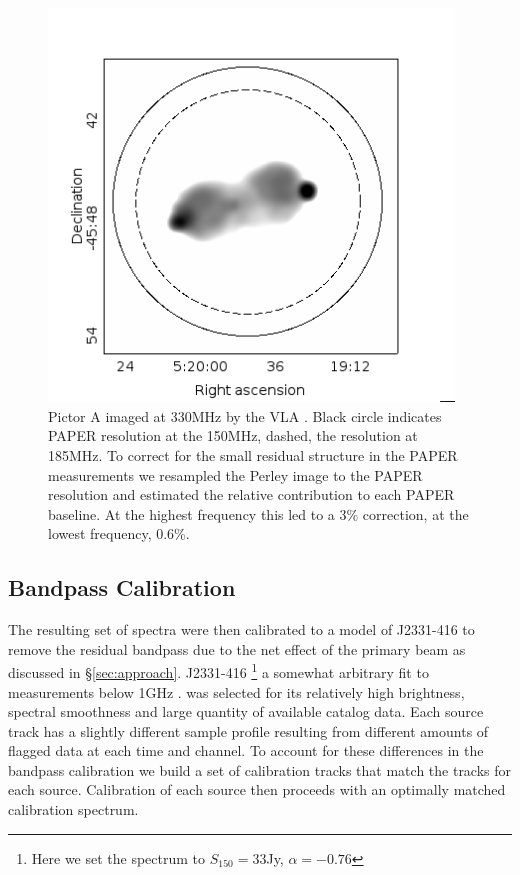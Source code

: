 \documentclass[preprint]{aastex}
\begin{document}
\begin{figure}
\includegraphics[width=0.96\textwidth]{plots/picA_Perley.png}
\caption{
Pictor A imaged at 330MHz by the VLA \citep{Perley:1997p9312}. Black circle
indicates PAPER resolution at the 150MHz, dashed, the resolution at 185MHz.  To
correct for the small residual structure in the PAPER measurements we resampled
the Perley image to the PAPER resolution and estimated the relative contribution
 to each PAPER baseline.  At the highest frequency this
led to a 3\% correction, at the lowest frequency, 0.6\%.
\label{fig:pic_perley}}
\end{figure}

\subsection{Bandpass Calibration}
\label{sec:Calibration}

The resulting set of spectra were then calibrated to a model of J2331-416 to remove 
the residual bandpass due to the net effect of the primary beam as discussed in \S \ref{sec:approach}. J2331-416 
\footnote{Here we set the spectrum to $S_{150}=33$Jy, $\alpha=-0.76$} a somewhat arbitrary 
fit to measurements below 1GHz \citep{Slee:1995p7541,Kuehr:1981p9628,Large:1981p7798,Burgess:2006p7814}.
was selected for its relatively high brightness, spectral smoothness and large quantity
 of available catalog data. Each source track has a slightly different sample profile
 resulting from different amounts of flagged data at each time and channel. To account
 for these differences in the bandpass calibration we build a set of calibration tracks 
 that match the tracks for each source. Calibration of each source then proceeds with
 an optimally matched calibration spectrum.
\end{document}
